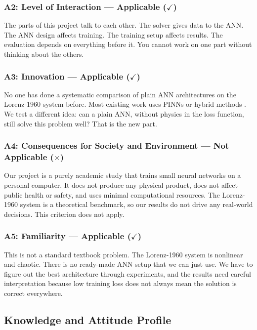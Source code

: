 \subsubsection{A2: Level of Interaction --- Applicable ($\checkmark$)}

The parts of this project talk to each other. The solver gives data to the ANN. The ANN design affects training. The training setup affects results. The evaluation depends on everything before it. You cannot work on one part without thinking about the others.

\subsubsection{A3: Innovation --- Applicable ($\checkmark$)}

No one has done a systematic comparison of plain ANN architectures on the Lorenz-1960 system before. Most existing work uses PINNs or hybrid methods \cite{matthews2024pinnde}. We test a different idea: can a plain ANN, without physics in the loss function, still solve this problem well? That is the new part.

\subsubsection{A4: Consequences for Society and Environment --- Not Applicable ($\times$)}

Our project is a purely academic study that trains small neural networks on a personal computer. It does not produce any physical product, does not affect public health or safety, and uses minimal computational resources. The Lorenz-1960 system is a theoretical benchmark, so our results do not drive any real-world decisions. This criterion does not apply.

\subsubsection{A5: Familiarity --- Applicable ($\checkmark$)}

This is not a standard textbook problem. The Lorenz-1960 system is nonlinear and chaotic. There is no ready-made ANN setup that we can just use. We have to figure out the best architecture through experiments, and the results need careful interpretation because low training loss does not always mean the solution is correct everywhere.

\subsection{Knowledge and Attitude Profile}

